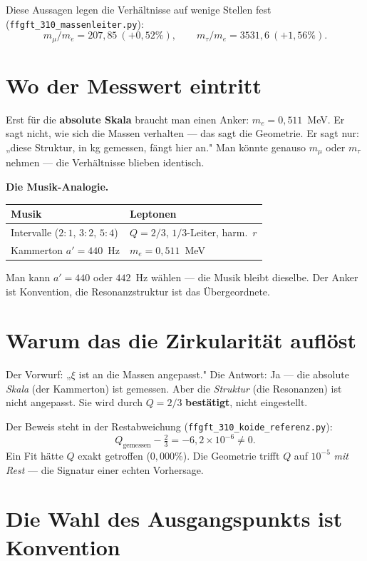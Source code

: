 Diese Aussagen legen die Verhältnisse auf wenige Stellen fest
(\texttt{ffgft\_310\_massenleiter.py}):
\[
  m_\mu/m_e = 207{,}85 \ (+0{,}52\%), \qquad
  m_\tau/m_e = 3531{,}6 \ (+1{,}56\%).
\]

\chapter{Wo der Messwert eintritt}

Erst für die \textbf{absolute Skala} braucht man einen Anker:
$m_e = 0{,}511$~MeV. Er sagt nicht, wie sich die Massen verhalten —
das sagt die Geometrie. Er sagt nur: „diese Struktur, in kg gemessen,
fängt hier an." Man könnte genauso $m_\mu$ oder $m_\tau$ nehmen — die
Verhältnisse blieben identisch.

\textbf{Die Musik-Analogie.}

\begin{center}
\begin{tabular}{ll}
\toprule
Musik & Leptonen \\
\midrule
Intervalle ($2{:}1$, $3{:}2$, $5{:}4$) & $Q=2/3$, $1/3$-Leiter, harm.\ $r$ \\
Kammerton $a' = 440$~Hz & $m_e = 0{,}511$~MeV \\
\bottomrule
\end{tabular}
\end{center}

Man kann $a' = 440$ oder $442$~Hz wählen — die Musik bleibt dieselbe.
Der Anker ist Konvention, die Resonanzstruktur ist das Übergeordnete.

\chapter{Warum das die Zirkularität auflöst}

Der Vorwurf: „$\xi$ ist an die Massen angepasst." Die Antwort: Ja — die
absolute \emph{Skala} (der Kammerton) ist gemessen. Aber die
\emph{Struktur} (die Resonanzen) ist nicht angepasst. Sie wird durch
$Q = 2/3$ \textbf{bestätigt}, nicht eingestellt.

Der Beweis steht in der Restabweichung
(\texttt{ffgft\_310\_koide\_referenz.py}):
\[
  Q_\text{gemessen} - \tfrac{2}{3} = -6{,}2 \times 10^{-6} \neq 0.
\]
Ein Fit hätte $Q$ exakt getroffen ($0{,}000\%$). Die Geometrie trifft
$Q$ auf $10^{-5}$ \emph{mit Rest} — die Signatur einer echten
Vorhersage.

\chapter{Die Wahl des Ausgangspunkts ist Konvention}

